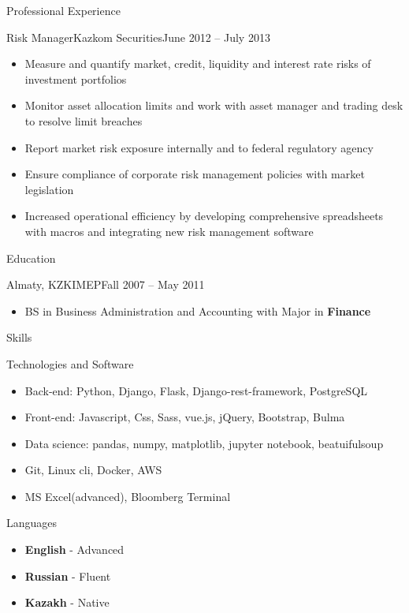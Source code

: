 \documentclass[]{mcdowellcv}
\begin{document}
\begin{cvsection}{Professional Experience}
  \begin{cvsubsection}{Risk Manager}{Kazkom Securities}{June 2012 -- July 2013}
    \begin{itemize}
      \item Measure and quantify market, credit, liquidity and interest rate risks of investment portfolios
      \item Monitor asset allocation limits and work with asset manager and trading desk to resolve limit breaches
      \item Report market risk exposure internally and to federal regulatory agency
      \item Ensure compliance of corporate risk management policies with market legislation
      \item Increased operational efficiency by developing comprehensive spreadsheets with macros and integrating new risk management software
    \end{itemize}
  \end{cvsubsection}
\end{cvsection}

\pagebreak

\begin{cvsection}{Education}
  \begin{cvsubsection}{Almaty, KZ}{KIMEP}{Fall 2007 -- May 2011}
    \begin{itemize}
      \item BS in Business Administration and Accounting with Major in \textbf{Finance}
    \end{itemize}
  \end{cvsubsection}
\end{cvsection}

\begin{cvsection}{Skills}
  \begin{cvsubsection}{Technologies and Software}{}{}	
      \begin{itemize}
        \item Back-end: Python, Django, Flask, Django-rest-framework, PostgreSQL
        \item Front-end: Javascript, Css, Sass, vue.js, jQuery, Bootstrap, Bulma
        \item Data science: pandas, numpy, matplotlib, jupyter notebook, beatuifulsoup
        \item Git, Linux cli, Docker, AWS
        \item MS Excel(advanced), Bloomberg Terminal
      \end{itemize}
  \end{cvsubsection}
  \begin{cvsubsection}{Languages}{}{}	
    \begin{itemize}
      \item \textbf{English} - Advanced
      \item \textbf{Russian} - Fluent
      \item \textbf{Kazakh} - Native
    \end{itemize}
  \end{cvsubsection}
\end{cvsection}
\end{document}

